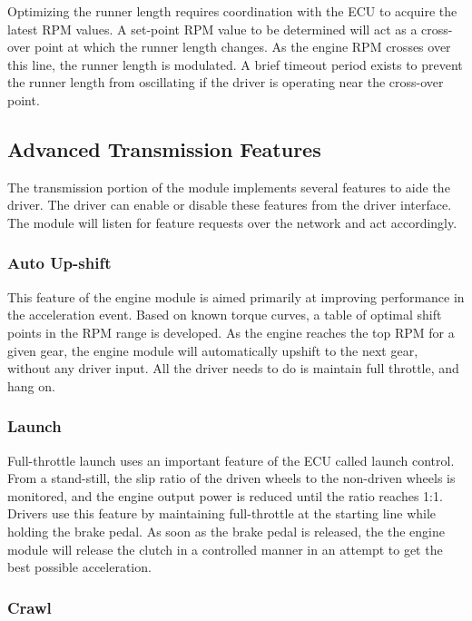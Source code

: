 Optimizing the runner length requires coordination with the ECU to acquire the latest RPM values. A set-point RPM value to be determined will act as a cross-over point at which the runner length changes. As the engine RPM crosses over this line, the runner length is modulated. A brief timeout period exists to prevent the runner length from oscillating if the driver is operating near the cross-over point.

\subsection{Advanced Transmission Features}

The transmission portion of the module implements several features to aide the driver. The driver can enable or disable these features from the driver interface. The module will listen for feature requests over the network and act accordingly.

\subsubsection{Auto Up-shift}

This feature of the engine module is aimed primarily at improving performance in the acceleration event. Based on known torque curves, a table of optimal shift points in the RPM range is developed. As the engine reaches the top RPM for a given gear, the engine module will automatically upshift to the next gear, without any driver input. All the driver needs to do is maintain full throttle, and hang on.

\subsubsection{Launch}

Full-throttle launch uses an important feature of the ECU called launch control. From a stand-still, the slip ratio of the driven wheels to the non-driven wheels is monitored, and the engine output power is reduced until the ratio reaches 1:1. Drivers use this feature by maintaining full-throttle at the starting line while holding the brake pedal. As soon as the brake pedal is released, the the engine module will release the clutch in a controlled manner in an attempt to get the best possible acceleration.

\subsubsection{Crawl}

